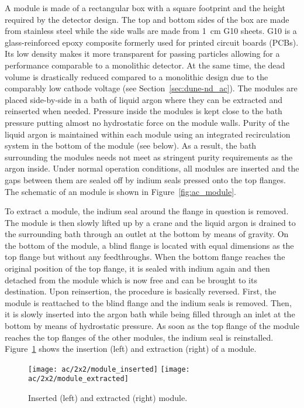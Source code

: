 A module is made of a rectangular box with a square footprint and the height required by the detector design.
The top and bottom sides of the box are made from stainless steel while the side walls are made from \SI{1}{\centi\metre} G10 sheets.
G10 is a glass-reinforced epoxy composite formerly used for printed circuit boards (PCBs).
Its low density makes it more transparent for passing particles allowing for a performance comparable to a monolithic detector.
At the same time, the dead volume is drastically reduced compared to a monolithic design due to the comparably low cathode voltage (see Section~\ref{sec:dune-nd_ac}).
The modules are placed side-by-side in a bath of liquid argon where they can be extracted and reinserted when needed.
Pressure inside the modules is kept close to the bath pressure putting almost no hydrostatic force on the module walls.
Purity of the liquid argon is maintained within each module using an integrated recirculation system in the bottom of the module (see below).
As a result, the bath surrounding the modules needs not meet as stringent purity requirements as the argon inside.
Under normal operation conditions, all modules are inserted and the gaps between them are sealed off by indium seals pressed onto the top flanges.
The schematic of an \AC{} module is shown in Figure~\ref{fig:ac_module}.

To extract a module, the indium seal around the flange in question is removed.
The module is then slowly lifted up by a crane and the liquid argon is drained to the surrounding bath through an outlet at the bottom by means of gravity.
On the bottom of the module, a blind flange is located with equal dimensions as the top flange but without any feedthroughs.
When the bottom flange reaches the original position of the top flange, it is sealed with indium again and then detached from the module which is now free and can be brought to its destination.
Upon reinsertion, the procedure is basically reversed.
First, the module is reattached to the blind flange and the indium seals is removed.
Then, it is slowly inserted into the argon bath while being filled through an inlet at the bottom by means of hydrostatic pressure.
As soon as the top flange of the module reaches the top flanges of the other modules, the indium seal is reinstalled.
Figure~\ref{fig:ac_module-ins-ext} shows the insertion (left) and extraction (right) of a module.

\begin{figure}[htb]
	\centering
	\texttt{[image: ac/2x2/module\_inserted]}
	\texttt{[image: ac/2x2/module\_extracted]}
	\caption{Inserted (left) and extracted (right) module.}
	\label{fig:ac_module-ins-ext}
\end{figure}

